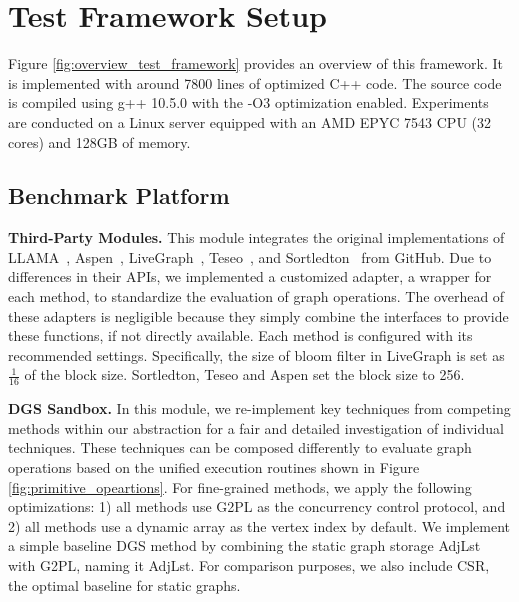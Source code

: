 \section{Test Framework Setup} \label{sec:test_framework_setup}


Figure \ref{fig:overview_test_framework} provides an overview of this framework. It is implemented with around 7800 lines of optimized C++ code. The source code is compiled using g++ 10.5.0 with the -O3 optimization enabled. Experiments are conducted on a Linux server equipped with an AMD EPYC 7543 CPU (32 cores) and 128GB of memory.



\subsection{Benchmark Platform} \label{sec:benchmark_platform}


\vspace{2pt}
\noindent\textbf{Third-Party Modules.} This module integrates the original implementations of LLAMA~\cite{llamacodebase}, Aspen~\cite{aspencodebase}, LiveGraph~\cite{livegraphcodebase}, Teseo~\cite{teseocodebase}, and Sortledton~\cite{sortledtoncosebase}  from GitHub. Due to differences in their APIs, we implemented a customized adapter, a wrapper for each method, to standardize the evaluation of graph operations. The overhead of these adapters is negligible because they simply combine the interfaces to provide these functions, if not directly available. Each method is configured with its recommended settings. Specifically, the size of bloom filter in LiveGraph is set as $\frac{1}{16}$ of the block size. Sortledton, Teseo and Aspen set the block size to 256.



\vspace{2pt}
\noindent\textbf{DGS Sandbox.} In this module, we re-implement key techniques from competing methods within our abstraction for a fair and detailed investigation of individual techniques. These techniques can be composed differently to evaluate graph operations based on the unified execution routines shown in Figure \ref{fig:primitive_opeartions}. For fine-grained methods, we apply the following optimizations: 1) all methods use G2PL as the concurrency control protocol, and 2) all methods use a dynamic array as the vertex index by default. We implement a simple baseline DGS method by combining the static graph storage AdjLst with G2PL, naming it AdjLst.  For comparison purposes, we also include CSR, the optimal baseline for static graphs.





